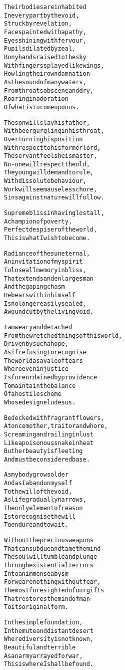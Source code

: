 \documentclass{article}
\begin{document}
\begin{alltt}
Their bodies are inhabited
In every part by the void,
Struck by revelation,
Faces painted with apathy,
Eyes shining with fervour,
Pupils dilated by zeal,
Bony hands raised to the sky
With fingers splayed like wings,
Howling their own damnation
As the sound of many waters,
From throats obscene and dry,
Roaring in adoration
Of what is to come upon us.

The son will slay his father,
With beer gurgling in his throat,
Overturning his position
With respect to his former lord,
The servant feels he is master,
No-one will respect the old,
The young will demand to rule,
With dissolute behaviour,
Work will seem a useless chore,
Sins against nature will follow.

Supreme bliss in having lost all,
A champion of poverty,
Perfect despiser of the world,
This is what I wish to become.

Radiance of the sun eternal,
An invitation of my spirit
To lose all memory in bliss,
That extends and enlarges man
And the gaping chasm
He bears within himself
Is no longer easily sealed,
A wound cut by the living void.

I am weary and detached
From the wretched things of this world,
Driven by such a hope,
As if refusing to recognise
The world as a vale of tears
Where even injustice
Is foreordained by providence
To maintain the balance
Of a hostile scheme
Whose design eludes us.

Bedecked with fragrant flowers,
At once mother, traitor and whore,
Screaming and railing in lust
Like a poisonous snake in heat
But her beauty is fleeting
And must be considered base.

As my body grows older
And as I abandon myself
To the will of the void,
As life gradually narrows,
The only element of reason
Is to recognise the will
To endure and to wait.

Without the precious weapons
That can subdue and tame the mind
The soul will tumble and plunge
Through existential terrors
Into an immense abysm
For we are nothing without fear,
The most foresighted of our gifts
That restores the mind of man
To its original form.

In the simple foundation,
In the mute and distant desert
Where diversity is not known,
Beautiful and terrible
As an army arrayed for war,
This is where I shall be found.
\end{alltt}

\iffalse
Holding up one finger as if in admonition
Immersed in gloom
The void can be named only through the most distorted things
Nothing exists that so fills and binds the heart as love does
On this side the choir of angels, on that the gaping maw of hell
What first triumphed in its folly and took delight in its jesting now is here punished and rewarded, liberated from the seduction of the passions, rigidified by eternity, consigned to the eternal frost that is to preserve and purify it, saved from corruption through the triumph of corruption
The people are transformed into an assembly belched forth from the abysms of the unknown earth
\fi
\end{document}
